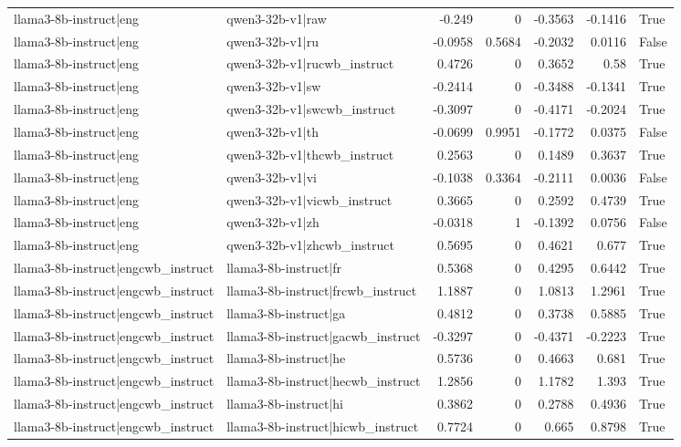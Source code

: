 \begin{table}
\begin{tabular}{l l r r r r l}
llama3-8b-instruct|eng & qwen3-32b-v1|raw & -0.249 & 0 & -0.3563 & -0.1416 & True \\
llama3-8b-instruct|eng & qwen3-32b-v1|ru & -0.0958 & 0.5684 & -0.2032 & 0.0116 & False \\
llama3-8b-instruct|eng & qwen3-32b-v1|rucwb_instruct & 0.4726 & 0 & 0.3652 & 0.58 & True \\
llama3-8b-instruct|eng & qwen3-32b-v1|sw & -0.2414 & 0 & -0.3488 & -0.1341 & True \\
llama3-8b-instruct|eng & qwen3-32b-v1|swcwb_instruct & -0.3097 & 0 & -0.4171 & -0.2024 & True \\
llama3-8b-instruct|eng & qwen3-32b-v1|th & -0.0699 & 0.9951 & -0.1772 & 0.0375 & False \\
llama3-8b-instruct|eng & qwen3-32b-v1|thcwb_instruct & 0.2563 & 0 & 0.1489 & 0.3637 & True \\
llama3-8b-instruct|eng & qwen3-32b-v1|vi & -0.1038 & 0.3364 & -0.2111 & 0.0036 & False \\
llama3-8b-instruct|eng & qwen3-32b-v1|vicwb_instruct & 0.3665 & 0 & 0.2592 & 0.4739 & True \\
llama3-8b-instruct|eng & qwen3-32b-v1|zh & -0.0318 & 1 & -0.1392 & 0.0756 & False \\
llama3-8b-instruct|eng & qwen3-32b-v1|zhcwb_instruct & 0.5695 & 0 & 0.4621 & 0.677 & True \\
llama3-8b-instruct|engcwb_instruct & llama3-8b-instruct|fr & 0.5368 & 0 & 0.4295 & 0.6442 & True \\
llama3-8b-instruct|engcwb_instruct & llama3-8b-instruct|frcwb_instruct & 1.1887 & 0 & 1.0813 & 1.2961 & True \\
llama3-8b-instruct|engcwb_instruct & llama3-8b-instruct|ga & 0.4812 & 0 & 0.3738 & 0.5885 & True \\
llama3-8b-instruct|engcwb_instruct & llama3-8b-instruct|gacwb_instruct & -0.3297 & 0 & -0.4371 & -0.2223 & True \\
llama3-8b-instruct|engcwb_instruct & llama3-8b-instruct|he & 0.5736 & 0 & 0.4663 & 0.681 & True \\
llama3-8b-instruct|engcwb_instruct & llama3-8b-instruct|hecwb_instruct & 1.2856 & 0 & 1.1782 & 1.393 & True \\
llama3-8b-instruct|engcwb_instruct & llama3-8b-instruct|hi & 0.3862 & 0 & 0.2788 & 0.4936 & True \\
llama3-8b-instruct|engcwb_instruct & llama3-8b-instruct|hicwb_instruct & 0.7724 & 0 & 0.665 & 0.8798 & True \\

\end{tabular}
\end{table}
